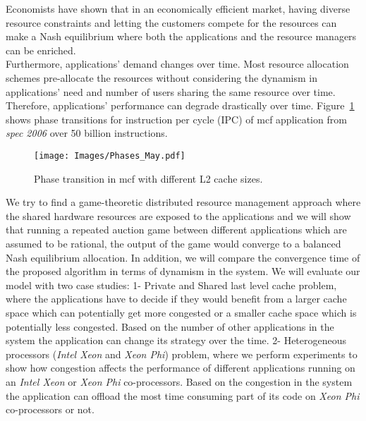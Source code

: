\indent Economists have shown that in an economically efficient market, having diverse resource constraints and letting the customers compete for the resources can make a Nash equilibrium where both the applications and the resource managers can be enriched. \\
\indent Furthermore, applications' demand changes over time. Most resource allocation schemes pre-allocate the resources without considering the dynamism in applications' need and number of users sharing the same resource over time. Therefore, applications' performance can degrade drastically over time. Figure~\ref{fig:Phases} shows phase transitions for instruction per cycle (IPC) of mcf application from \textit{spec 2006} over 50 billion instructions. \\ 
\begin{figure}[!tb]
\centering
\texttt{[image: Images/Phases\_May.pdf]} %
\caption{\label{fig:Phases}Phase transition in mcf with different L2 cache sizes.}
\end{figure}
\indent We try to find a game-theoretic distributed resource management approach where the shared hardware resources are exposed to the applications and we will show that running a repeated auction game between different applications which are assumed to be rational, the output of the game would converge to a balanced Nash equilibrium allocation. In addition, we will compare the convergence time of the proposed algorithm in terms of dynamism in the system. We will evaluate our model with two case studies: 1- Private and Shared last level cache problem, where the applications have to decide if they would benefit from a larger cache space which can potentially get more congested or a smaller cache space which is potentially less congested. Based on the number of other applications in the system the application can change its strategy over the time. 2- Heterogeneous processors (\textit{Intel Xeon} and \textit{Xeon Phi}) problem, where we perform experiments to show how congestion affects the performance of different applications running on an \textit{Intel Xeon} or \textit{Xeon Phi} co-processors. Based on the congestion in the system the application can offload the most time consuming part of its code on \textit{Xeon Phi} co-processors or not.   
